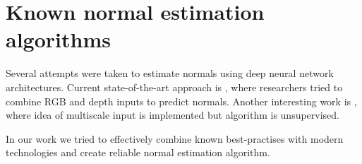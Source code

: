 \section{Known normal estimation algorithms}

Several attempts were taken to estimate normals using deep neural network architectures. Current state-of-the-art approach is \cite{deep_surf}, where researchers tried to combine RGB and depth inputs to predict normals. Another interesting work is \cite{adaptive-neighborhood}, where idea of multiscale input is implemented but algorithm is unsupervised.

In our work we tried to effectively combine known best-practises with modern technologies and create reliable normal estimation algorithm.